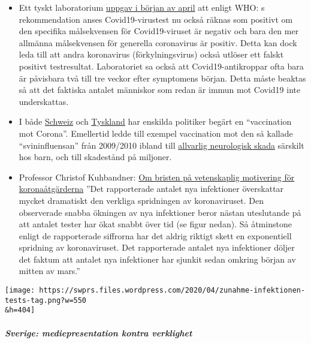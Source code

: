 \begin{itemize}
\item
  Ett tyskt laboratorium
  \href{http://www.labor-augsburg-mvz.de/de/aktuelles/coronavirus}{uppgav
  i början av april} att enligt WHO: s rekommendation anses
  Covid19-virustest nu också räknas som positivt om den specifika
  målsekvensen för Covid19-viruset är negativ och bara den mer allmänna
  målsekvensen för generella coronavirus är positiv. Detta kan dock leda
  till att andra koronavirus (förkylningsvirus) också utlöser ett falskt
  positivt testresultat. Laboratoriet sa också att Covid19-antikroppar
  ofta bara är påvisbara två till tre veckor efter symptomens början.
  Detta måste beaktas så att det faktiska antalet människor som redan är
  immun mot Covid19 inte underskattas.
\item
  I både
  \href{https://www.20min.ch/schweiz/news/story/-rzte-und-Politiker-fordern-Corona-Impfzwang-20853917}{Schweiz}
  och
  \href{https://www.faz.net/agenturmeldungen/dpa/soeder-waere-fuer-deutschlandweite-impfpflicht-gegen-corona-16738369.html}{Tyskland}
  har enskilda politiker begärt en ``vaccination mot Corona''.
  Emellertid ledde till exempel vaccination mot den så kallade
  ``svininfluensan'' från 2009/2010 ibland till
  \href{https://www.ibtimes.co.uk/brain-damaged-uk-victims-swine-flu-vaccine-get-60-million-compensation-1438572}{allvarlig
  neurologisk skada} särskilt hos barn, och till skadestånd på miljoner.
\item
  Professor Christof Kuhbandner:
  \href{https://www.heise.de/tp/features/Von-der-fehlenden-wissenschaftlichen-Begruendung-der-Corona-Massnahmen-4709563.html?seite=all}{Om
  bristen på vetenskaplig motivering för koronaåtgärderna} ''Det
  rapporterade antalet nya infektioner överskattar mycket dramatiskt den
  verkliga spridningen av koronaviruset. Den observerade snabba ökningen
  av nya infektioner beror nästan uteslutande på att antalet tester har
  ökat snabbt över tid (se figur nedan). Så åtminstone enligt de
  rapporterade siffrorna har det aldrig riktigt skett en exponentiell
  spridning av koronaviruset. Det rapporterade antalet nya infektioner
  döljer det faktum att antalet nya infektioner har sjunkit sedan
  omkring början av mitten av mars.''
\end{itemize}

\texttt{[image: https://swprs.files.wordpress.com/2020/04/zunahme-infektionen-tests-tag.png?w=550\\\&h=404]}

\hypertarget{sverige-mediepresentation-kontra-verklighet}{%
\subparagraph{\texorpdfstring{\textbf{Sverige: mediepresentation kontra
verklighet}}{Sverige: mediepresentation kontra verklighet}}\label{sverige-mediepresentation-kontra-verklighet}}

